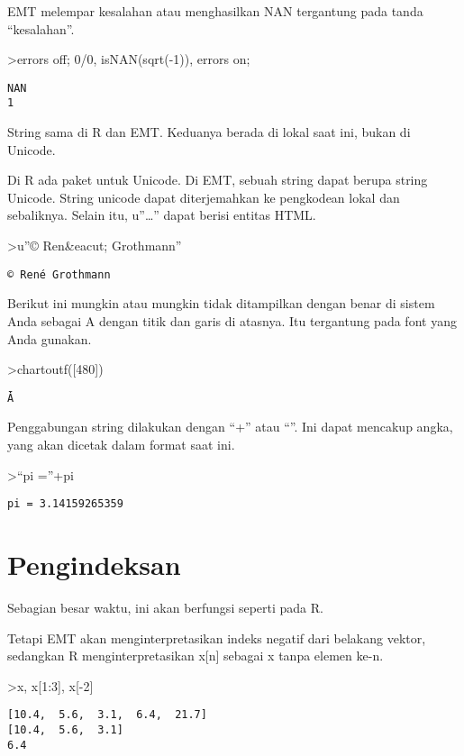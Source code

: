 \documentclass[
]{book}
\begin{document}
EMT melempar kesalahan atau menghasilkan NAN tergantung pada tanda ``kesalahan''.

\textgreater errors off; 0/0, isNAN(sqrt(-1)), errors on;

\begin{verbatim}
NAN
1
\end{verbatim}

String sama di R dan EMT. Keduanya berada di lokal saat ini, bukan di Unicode.

Di R ada paket untuk Unicode. Di EMT, sebuah string dapat berupa string Unicode. String unicode dapat diterjemahkan ke pengkodean lokal dan sebaliknya. Selain itu, u''\ldots'' dapat berisi entitas HTML.

\textgreater u''© Ren\&eacut; Grothmann''

\begin{verbatim}
© René Grothmann
\end{verbatim}

Berikut ini mungkin atau mungkin tidak ditampilkan dengan benar di sistem Anda sebagai A dengan titik dan garis di atasnya. Itu tergantung pada font yang Anda gunakan.

\textgreater chartoutf({[}480{]})

\begin{verbatim}
Ǡ
\end{verbatim}

Penggabungan string dilakukan dengan ``+'' atau ``\textbar{}''. Ini dapat mencakup angka, yang akan dicetak dalam format saat ini.

\textgreater{}``pi =''+pi

\begin{verbatim}
pi = 3.14159265359
\end{verbatim}

\chapter{Pengindeksan}\label{pengindeksan}

Sebagian besar waktu, ini akan berfungsi seperti pada R.

Tetapi EMT akan menginterpretasikan indeks negatif dari belakang vektor, sedangkan R menginterpretasikan x{[}n{]} sebagai x tanpa elemen ke-n.

\textgreater x, x{[}1:3{]}, x{[}-2{]}

\begin{verbatim}
[10.4,  5.6,  3.1,  6.4,  21.7]
[10.4,  5.6,  3.1]
6.4
\end{verbatim}
\end{document}
